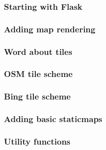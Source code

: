 \documentclass{beamer}
\begin{document}
\begin{frame}
  \frametitle{Starting with Flask}

\end{frame}

\begin{frame}
  \frametitle{Adding map rendering}

\end{frame}

\begin{frame}
  \frametitle{Word about tiles}

\end{frame}

\begin{frame}
  \frametitle{OSM tile scheme}

\end{frame}

\begin{frame}
  \frametitle{Bing tile scheme}

\end{frame}

\begin{frame}
  \frametitle{Adding basic staticmaps}

\end{frame}

\begin{frame}
  \frametitle{Utility functions}

\end{frame}









\end{document}
